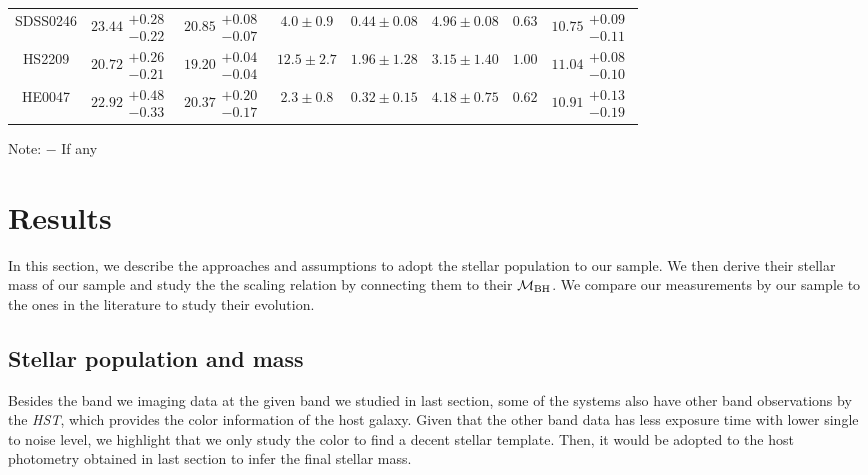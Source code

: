 \documentclass[fleqn,usenatbib]{mnras}
\newcommand{\hst}{{\it HST}}
\newcommand{\mbh}{$\mathcal M_{\rm BH}$}
\begin{document}
\begin{table}
\begin{threeparttable}
\begin{tabular}{cccccccc}
SDSS0246 & $23.44\substack{+0.28\\-0.22}$ & $20.85\substack{+0.08\\-0.07}$ & $4.0\pm0.9$ & $0.44\pm0.08$ & $4.96\pm0.08$ & $0.63$ & $10.75\substack{+0.09\\-0.11}$ \\
HS2209 & $20.72\substack{+0.26\\-0.21}$ & $19.20\substack{+0.04\\-0.04}$ & $12.5\pm2.7$ & $1.96\pm1.28$ & $3.15\pm1.40$ & $1.00$ & $11.04\substack{+0.08\\-0.10}$ \\
HE0047 & $22.92\substack{+0.48\\-0.33}$ & $20.37\substack{+0.20\\-0.17}$ & $2.3\pm0.8$ & $0.32\pm0.15$ & $4.18\pm0.75$ & $0.62$ & $10.91\substack{+0.13\\-0.19}$ \\
\hline
\end{tabular}
\begin{tablenotes}
      \small
      \item Note: $-$ If any
\end{tablenotes}    
\end{threeparttable}
\end{table}


\section{Results}\label{sec:result}
In this section, we describe the approaches and assumptions to adopt the stellar population to our sample. We then derive their stellar mass of our sample and study the  the scaling relation by connecting them to their \mbh. We compare our measurements by our sample to the ones in the literature to study their evolution.

\subsection{Stellar population and mass}\label{sec:mstar}
Besides the band we imaging data at the given band we studied in last section, some of the systems also have other band observations by the \hst, which provides the color information of the host galaxy. Given that the other band data has less exposure time with lower single to noise level, we highlight that we only study the color to find a decent stellar template. Then, it would be adopted to the host photometry obtained in last section to infer the final stellar mass.
\end{document}

